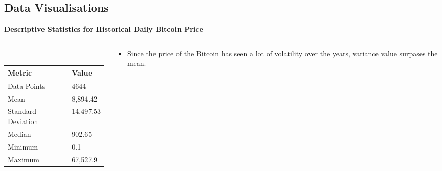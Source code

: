 \documentclass{beamer}
\begin{document}
	\subsection{Data Visualisations}
	\begin{frame}
	\textbf{Descriptive Statistics for Historical Daily Bitcoin Price}\\
	\begin{columns}
	\begin{column}{0.5\textwidth}
	\\
		\begin{tabular}{|l|l|} \hline
			Metric & Value \\ \hline
			Data Points & 4644 \\ 
			Mean & 8,894.42 \\
			Standard Deviation & 14,497.53 \\
			Median & 902.65\\
			Minimum & 0.1\\
			Maximum & 67,527.9\\ \hline
		\end{tabular}
		\end{column}
		\begin{column}{0.5\textwidth}
			\begin{itemize}
				\item Since the price of the Bitcoin has seen a lot of volatility over the years, variance value surpases the mean.
			\end{itemize}
		\end{column}
		\end{columns}
		\end{frame}
\end{document}
